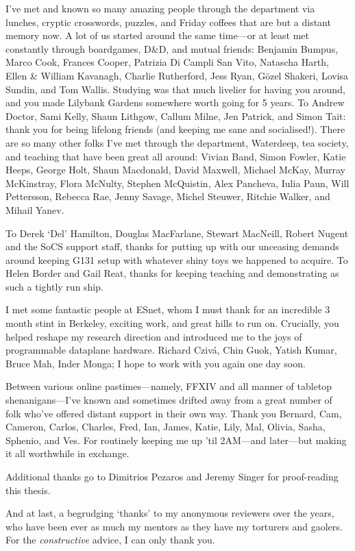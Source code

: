 I've met and known so many amazing people through the department via lunches, cryptic crosswords, puzzles, and Friday coffees that are but a distant memory now.
A lot of us started around the same time---or at least met constantly through boardgames, D\&D, and mutual friends: Benjamin Bumpus, Marco Cook, Frances Cooper, Patrizia Di Campli San Vito, Natascha Harth, Ellen \& William Kavanagh, Charlie Rutherford, Jess Ryan, G\"{o}zel Shakeri, Lovisa Sundin, and Tom Wallis.
Studying was that much livelier for having you around, and you made Lilybank Gardens somewhere worth going for 5 years.
To Andrew Doctor, Sami Kelly, Shaun Lithgow, Callum Milne, Jen Patrick, and Simon Tait: thank you for being lifelong friends (and keeping me sane and socialised!).
There are so many other folks I've met through the department, Waterdeep, tea society, and teaching that have been great all around: Vivian Band, Simon Fowler, Katie Heeps, George Holt, Shaun Macdonald, David Maxwell, Michael McKay, Murray McKinstray, Flora McNulty, Stephen McQuistin, Alex Pancheva, Iulia Paun, Will Pettersson, Rebecca Rae, Jenny Savage, Michel Steuwer, Ritchie Walker, and Mihail Yanev.

To Derek `Del' Hamilton, Douglas MacFarlane, Stewart MacNeill, Robert Nugent and the SoCS support staff, thanks for putting up with our unceasing demands around keeping G131 setup with whatever shiny toys we happened to acquire.
To Helen Border and Gail Reat, thanks for keeping teaching and demonstrating as such a tightly run ship.

I met some fantastic people at ESnet, whom I must thank for an incredible 3 month stint in Berkeley, exciting work, and great hills to run on.
Crucially, you helped reshape my research direction and introduced me to the joys of programmable dataplane hardware.
Richard Cziv\'{a}, Chin Guok, Yatish Kumar, Bruce Mah, Inder Monga; I hope to work with you again one day soon.

Between various online pastimes---namely, FFXIV and all manner of tabletop shenanigans---I've known and sometimes drifted away from a great number of folk who've offered distant support in their own way.
Thank you Bernard, Cam, Cameron, Carlos, Charles, Fred, Ian, James, Katie, Lily, Mal, Olivia, Sasha, Sphenio, and Ves.
For routinely keeping me up 'til 2AM---and later---but making it all worthwhile in exchange.

Additional thanks go to Dimitrios Pezaros and Jeremy Singer for proof-reading this thesis.

And at last, a begrudging `thanks' to my anonymous reviewers over the years, who have been ever as much my mentors as they have my torturers and gaolers.
For the \emph{constructive} advice, I can only thank you.

